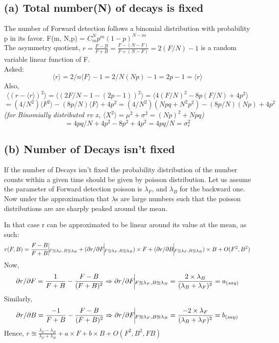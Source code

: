 \documentclass[11pt]{article}
\begin{document}
	\subsection*{(a) Total number(N) of decays is fixed}
	The number of Forward detection follows a binomial distribution with probability p in its favor. F(m, N,p) = $C^N_m p^m (1-p)^{N-m}$\\
	The asymmetry quotient, \( r = \frac{F-B}{F+B} = \frac{F-(N-F)}{F+(N-F)} = 2(F/N)-1\) is a random variable linear function of F.\\
	Asked:
	\[
		\langle r \rangle = 2/n \langle F \rangle -1 = 2/N (Np) - 1 = \boxed{2p-1 = \langle r \rangle}
	\]
	Also,
	\[
		\langle (r - \langle r \rangle)^2 \rangle = \langle (2 F/N - 1 -(2p -1))^2 \rangle = \langle 4(F/N)^2 - 8p(F/N) + 4p^2 \rangle
	\]
	\[
		 = (4/N^2) \langle F^2 \rangle -(8p/N) \langle F \rangle + 4p^2 = (4/N^2) (Npq + N^2p^2) -  (8p/N) (Np) + 4p^2
	\]\textit{(for Binomially distributed rv x,  $\langle X^2\rangle = \mu^2 +\sigma ^2 = (Np)^2 + Npq$)}
	\[
		= 4pq/N + 4p^2 - 8p^2 +4p^2 = \boxed{4pq/N =\sigma^2_r}
	\]		
	
	\subsection*{(b) Number of Decays isn't fixed}
	
	If the number of Decays isn't fixed the probability distribution of the number counts within a given time should be given by poisson distribution. Let us assume the parameter of Forward detection poisson is $\lambda_F$, and
	$\lambda_B$ for the backward one.\\
	Now under the approximation that $\lambda$s are large numbers such that the poisson distributions are are sharply peaked around the mean.
	
	In that case r can be approximated to be linear around its value at the mean, as such:\\
	\[
		r(F,B) = \frac{F-B}{F+B}\vline_{F\approxeq \lambda_F, B\approxeq \lambda_B} + (\partial r/\partial F \vline_{F\approxeq \lambda_F, B\approxeq \lambda_B}) \times F
		+ (\partial r/\partial B \vline_{F\approxeq \lambda_F, B\approxeq \lambda_B}) \times B + O(F^2, B^2)
	\]
	Now, 
	\[
		\partial r/\partial F = \frac{1}{F+B} - \frac{F-B}{(F+B)^2} 
		\Rightarrow 	\partial r/\partial F \vline_{F\approxeq \lambda_F, B\approxeq \lambda_B} = \frac{2\times\lambda_B}{(\lambda_B+\lambda_F)^2} = a_{(say)}
	\]
	Similarly,
	\[
		\partial r/\partial B = \frac{-1}{F+B} - \frac{F-B}{(F+B)^2} 
		\Rightarrow 	\partial r/\partial F \vline_{F\approxeq \lambda_F, B\approxeq \lambda_B} = \frac{-2\times\lambda_F}{(\lambda_B+\lambda_F)^2} = b_{(say)}
	\]
	Hence, \( r \approxeq \frac{\lambda_F-\lambda_B}{\lambda_F + \lambda_B} + a\times F + b \times B + O(F^2,B^2,FB) \)\\
	
\end{document}
